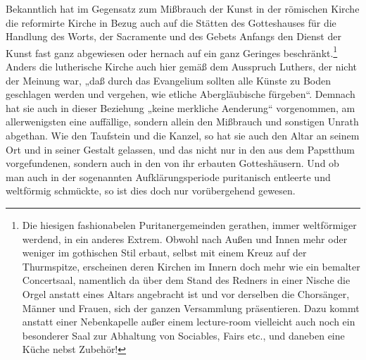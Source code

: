 Bekanntlich hat im Gegensatz zum Mißbrauch der Kunst in der römischen Kirche die reformirte Kirche in Bezug auch auf die Stätten des Gotteshauses für die Handlung des Worts, der Sacramente und des Gebets Anfangs den Dienst der Kunst fast ganz abgewiesen oder hernach auf ein ganz Geringes beschränkt.\footnote{Die hiesigen fashionabelen Puritanergemeinden gerathen, immer weltförmiger werdend, in ein anderes Extrem. Obwohl nach Außen und Innen mehr oder weniger im gothischen Stil erbaut, selbst mit einem Kreuz auf der Thurmspitze, erscheinen deren Kirchen im Innern doch mehr wie ein bemalter Concertsaal, namentlich da über dem Stand des Redners in einer Nische die Orgel anstatt eines Altars angebracht ist und vor derselben die Chorsänger, Männer und Frauen, sich der ganzen Versammlung präsentieren. Dazu kommt anstatt einer Nebenkapelle außer einem lecture-room vielleicht auch noch ein besonderer Saal zur Abhaltung von Sociables, Fairs etc., und daneben eine Küche nebst Zubehör!} Anders die lutherische Kirche auch hier gemäß dem Ausspruch Luthers, der nicht der Meinung war, „daß durch das Evangelium sollten alle Künste zu Boden geschlagen werden und vergehen, wie etliche Abergläubische fürgeben“. Demnach hat sie auch in dieser Beziehung „keine merkliche Aenderung“ vorgenommen, am allerwenigsten eine auffällige, sondern allein den Mißbrauch und sonstigen Unrath abgethan. Wie den Taufstein und die Kanzel, so hat sie auch den Altar an seinem Ort und in seiner Gestalt gelassen, und das nicht nur in den aus dem Papstthum vorgefundenen, sondern auch in den von ihr erbauten Gotteshäusern. Und ob man auch in der sogenannten Aufklärungsperiode puritanisch entleerte und weltförmig schmückte, so ist dies doch nur vorübergehend gewesen.

